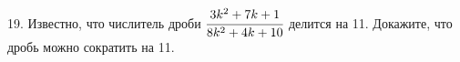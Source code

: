 19. Известно, что числитель дроби $\cfrac{3k^2+7k+1}{8k^2+4k+10}$ делится на 11. Докажите, что дробь можно сократить на 11.\\
